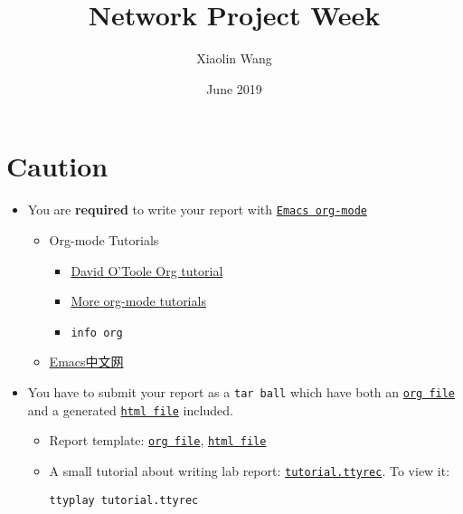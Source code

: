 \documentclass{article} [NO-DEFAULT-PACKAGES] \usepackage{wx672hyperref}
\author{Xiaolin Wang}
\date{June 2019}
\title{Network Project Week}
\begin{document}
\maketitle
\tableofcontents


\section{Caution}
\label{sec:orgc02b7a2}
\begin{itemize}
\item You are \textbf{required} to write your report with \href{http://orgmode.org/}{\texttt{Emacs org-mode}}
\begin{itemize}
\item Org-mode Tutorials
\begin{itemize}
\item \href{http://orgmode.org/worg/org-tutorials/orgtutorial\_dto.php}{David O'Toole Org tutorial}
\item \href{http://orgmode.org/worg/org-tutorials/index.php}{More org-mode tutorials}
\item \texttt{info org}
\end{itemize}
\item \href{http://emacser.com/}{Emacs中文网}
\end{itemize}
\item You have to submit your report as a \texttt{tar ball} which have both an \href{20141156xxx.org}{\texttt{org file}} and a
generated \href{20141156xxx.html}{\texttt{html file}} included.
\begin{itemize}
\item Report template: \href{20141156xxx.org}{\texttt{org file}}, \href{20141156xxx.html}{\texttt{html file}}
\item A small tutorial about writing lab report: \href{tutorial.ttyrec}{\texttt{tutorial.ttyrec}}. To view it:
\begin{verbatim}
ttyplay tutorial.ttyrec
\end{verbatim}


\end{itemize}
\end{itemize}
\end{document}
